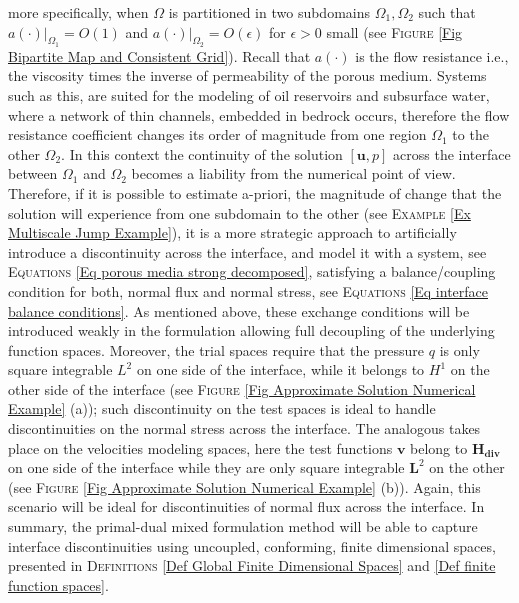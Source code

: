 \documentclass[3p]{elsarticle}
\def\u{\mathbf u}
\def\v{\mathbf v}
\def\Hdiv{\mathbf{H_{div}}}
\begin{document}
more specifically, when $\Omega$ is partitioned in two subdomains $\Omega_{1}, \Omega_{2}$ such that $a(\cdot)\big\vert_{\Omega_{1}} = O(1)$ and $a(\cdot)\big\vert_{\Omega_{2}} = O(\epsilon)$ for $\epsilon>0$ small (see \textsc{Figure} \ref{Fig Bipartite Map and Consistent Grid}). Recall that $ a(\cdot) $ is the flow resistance i.e., the viscosity times the inverse of permeability of the porous medium. Systems such as this, are suited for the modeling of oil reservoirs and subsurface water, where a network of thin channels, embedded in bedrock occurs, therefore the flow resistance coefficient changes its order of magnitude from one region $ \Omega_{1} $ to the other $ \Omega_{2} $. In this context the continuity of the solution $[\u, p]$ across the interface between $\Omega_{1}$ and $\Omega_{2}$ becomes a liability from the numerical point of view. Therefore, if it is possible to estimate a-priori, the magnitude of change that the solution will experience from one subdomain to the other (see \textsc{Example} \ref{Ex Multiscale Jump Example}), it is a more strategic approach to artificially introduce a discontinuity across the interface, and model it with a system, see \textsc{Equations} \eqref{Eq porous media strong decomposed}, satisfying a balance/coupling condition for both, normal flux and normal stress, see \textsc{Equations} \eqref{Eq interface balance conditions}. As mentioned above, these exchange conditions will be introduced weakly in the formulation allowing full decoupling of the underlying function spaces. Moreover, the trial spaces require that the pressure $ q $ is only square integrable $ L^{2} $ on one side of the interface, while it belongs to $ H^{1} $ on the other side of the interface (see \textsc{Figure}  \ref{Fig Approximate Solution Numerical Example} (a)); such discontinuity on the test spaces is ideal to handle discontinuities on the normal stress across the interface. The analogous takes place on the velocities modeling spaces, here the test functions $\v$ belong to $\Hdiv$ on one side of the interface while they are only square integrable $\mathbf{L}^{2}$ on the other (see \textsc{Figure}  \ref{Fig Approximate Solution Numerical Example} (b)). Again, this scenario will be ideal for discontinuities of normal flux across the interface. In summary, the primal-dual mixed formulation method will be able to capture interface discontinuities using uncoupled, conforming, finite dimensional spaces, presented in \textsc{Definitions} \ref{Def Global Finite Dimensional Spaces} and \ref{Def finite function spaces}.
\end{document}

